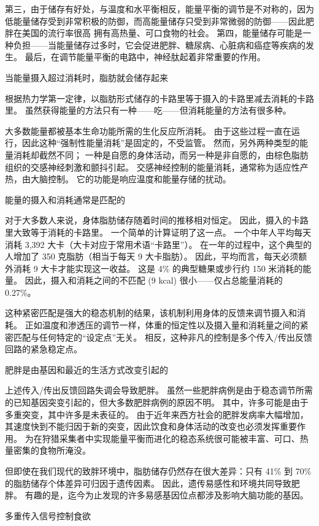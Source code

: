 第三，由于储存有好处，与温度和水平衡相反，能量平衡的调节是不对称的，因为低能量储存受到非常积极的防御，而高能量储存只受到非常微弱的防御——因此肥胖在美国的流行率很高 拥有高热量、可口食物的社会。 第四，能量储存可能是一种负担——当能量储存过多时，它会促进肥胖、糖尿病、心脏病和癌症等疾病的发生。 最后，在调节能量平衡的电路中，神经肽起着非常重要的作用。

当能量摄入超过消耗时，脂肪就会储存起来

根据热力学第一定律，以脂肪形式储存的卡路里等于摄入的卡路里减去消耗的卡路里。 虽然获得能量的方法只有一种——吃——但消耗能量的方法有很多种。

大多数能量都被基本生命功能所需的生化反应所消耗。 由于这些过程一直在运行，因此这种“强制性能量消耗”是固定的，不受监管。 然而，另外两种类型的能量消耗却截然不同； 一种是自愿的身体活动，而另一种是非自愿的，由棕色脂肪组织的交感神经刺激和颤抖引起。 交感神经控制的能量消耗，通常称为适应性产热，由大脑控制。 它的功能是响应温度和能量存储的扰动。

能量的摄入和消耗通常是匹配的

对于大多数人来说，身体脂肪储存随着时间的推移相对恒定。 因此，摄入的卡路里大致等于消耗的卡路里。 一个简单的计算证明了这一点。 一个中年人平均每天消耗 3,392 大卡（大卡对应于常用术语“卡路里”）。 在一年的过程中，这个典型的人增加了 350 克脂肪（相当于每天 9 大卡脂肪）。 因此，平均而言，每天必须额外消耗 9 大卡才能实现这一收益。 这是 4\% 的典型糖果或步行约 150 米消耗的能量。 因此，摄入和消耗之间的不匹配 (9 kcal) 很小——仅占总能量消耗的 0.27\%。

这种紧密匹配是强大的稳态机制的结果，该机制利用身体的反馈来调节摄入和消耗。 正如温度和渗透压的调节一样，体重的恒定性以及摄入量和消耗量之间的紧密匹配与任何特定的“设定点”无关。 相反，这种非凡的控制是多个传入/传出反馈回路的紧急稳定点。

肥胖是由基因和最近的生活方式改变引起的

上述传入/传出反馈回路失调会导致肥胖。 虽然一些肥胖病例是由于稳态调节所需的已知基因突变引起的，但大多数肥胖病例的原因不明。 其中，许多可能是由于多重突变，其中许多是未表征的。 由于近年来西方社会的肥胖发病率大幅增加，其速度快到不能归因于新的突变，因此饮食和身体活动的改变也必须发挥重要作用。 为在狩猎采集者中实现能量平衡而进化的稳态系统很可能被丰富、可口、热量密集的食物所淹没。

但即使在我们现代的致胖环境中，脂肪储存仍然存在很大差异：只有 41\% 到 70\% 的脂肪储存个体差异可归因于遗传因素。 因此，遗传易感性和环境共同导致肥胖。 有趣的是，迄今为止发现的许多易感基因位点都涉及影响大脑功能的基因。

多重传入信号控制食欲

